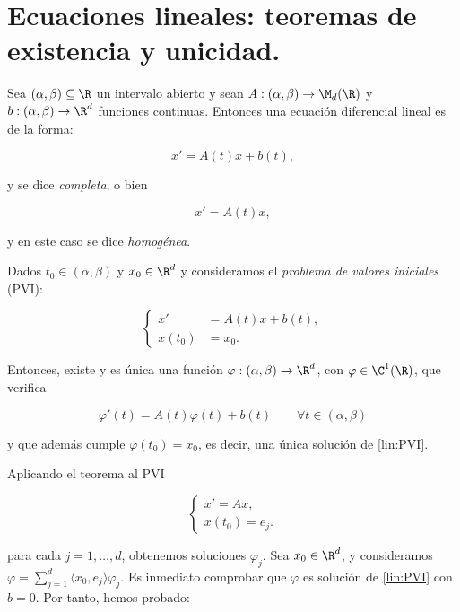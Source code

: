 \section{Ecuaciones lineales: teoremas de existencia y unicidad.}


\begin{ndef}
Sea $(\alpha,\beta)\subseteq \R$ un intervalo abierto y sean $A:(\alpha,\beta)\to \M_d(\R)$ y $b:(\alpha,\beta)\to \R^d$ funciones continuas. Entonces una ecuación diferencial lineal es de la forma:

\begin{equation}
x'=A(t)x+b(t) \tag{C} \label{lin:completa}
,\end{equation}

y se dice \emph{completa}, o bien

\begin{equation}
x'=A(t)x \tag{H} \label{lin:homogenea}
,\end{equation}

y en este caso se dice \emph{homogénea}.
\end{ndef}

\begin{nth}
Dados $t_0\in(\alpha,\beta)$ y $x_0 \in \R^d$ y consideramos el \emph{problema de valores iniciales} (PVI):

\begin{equation}
\left\{\begin{array}{rl}
x' &=A(t)x+b(t), \\
x(t_0)&=x_0.
\end{array}\right.
\tag{PVI}\label{lin:PVI}
\end{equation}

Entonces, existe y es única una función $\varphi : (\alpha,\beta)\to\R^d$, con $\varphi \in \C ^ 1(\R)$, que verifica

\[
\varphi'(t) = A(t)\varphi(t) + b(t) \qquad \forall t \in (\alpha,\beta)
\]

y que además cumple $\varphi(t_0)=x_0$, es decir, una única solución de \ref{lin:PVI}.
\end{nth}

Aplicando el teorema al PVI

\[
\begin{cases}
  x' = Ax, \\
  x(t_0) = e_j.
\end{cases}
\tag{PVI$_j$} \label{lin:PVIj}
\]

para cada $j=1,\dots,d$, obtenemos soluciones $\varphi_j$. Sea $x_0\in \R^d$, y consideramos $\varphi = \sum_{j=1}^d \langle x_0,e_j \rangle\varphi_j$.
Es inmediato comprobar que $\varphi$ es solución de \ref{lin:PVI} con $b=0$. Por tanto, hemos probado:

